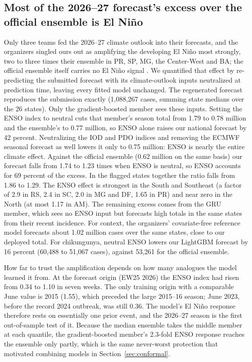 \documentclass[11pt]{article}
\begin{document}
\subsection{Most of the 2026--27 forecast's excess over the official ensemble is El Ni\~no}
\label{sec:elnino}
Only three teams fed the 2026--27 climate outlook into their forecasts, and the organizers singled
ours out as amplifying the developing El Ni\~no most strongly, two to three times their ensemble in
PR, SP, MG, the Center-West and BA; the official ensemble itself carries no El Ni\~no signal
\citep{imdc2026results}. We quantified that effect by re-predicting the submitted forecast with its
climate-outlook inputs neutralized at prediction time, leaving every fitted model unchanged. The
regenerated forecast reproduces the submission exactly (1,088,267 cases, summing state medians over
the 26 states). Only the gradient-boosted member sees these inputs. Setting the ENSO index to neutral
cuts that member's season total from 1.79 to 0.78 million and the ensemble's to 0.77 million, so
ENSO alone raises our national forecast by 42 percent. Neutralizing the IOD and PDO indices and
removing the ECMWF seasonal forecast as well lowers it only to 0.75 million: ENSO is nearly the
entire climate effect. Against the official ensemble (0.62 million on the same basis) our forecast
falls from 1.74 to 1.23 times when ENSO is neutral, so ENSO accounts for 69 percent of the excess.
In the flagged states together the ratio falls from 1.86 to 1.29. The ENSO effect is strongest in
the South and Southeast (a factor of 2.9 in RS, 2.4 in SC, 2.0 in MG and DF, 1.65 in PR) and near
zero in the North (at most 1.17 in AM). The remaining excess comes from the GRU member, which sees no
ENSO input but forecasts high totals in the same states from their recent incidence. For context, the
organizers' covariate-free reference model forecasts about 1.02 million cases over the same states,
close to our deployed total. For chikungunya, neutral ENSO lowers our LightGBM forecast by 16 percent
(60,488 to 51,067 cases), against 53,261 for the official ensemble.

How far to trust the amplification depends on how many analogues the model learned it from. At the
forecast origin (EW25 2026) the ENSO index had risen from 0.34 to 1.10 in seven weeks. The only
training origin with a comparable June value is 2015 (1.55), which preceded the large 2015--16
season; June 2023, before the record 2024 outbreak, was still 0.36. The model's El Ni\~no response
therefore rests on essentially one prior event, and the 2026--27 season is the first out-of-sample
test of it. Because the median ensemble takes the middle member at each quantile, the
gradient-boosted member's 2.3-fold ENSO response reaches the ensemble only partly, which is the
same never-worst protection that motivated combining models in Section~\ref{sec:conformal}.
\end{document}
